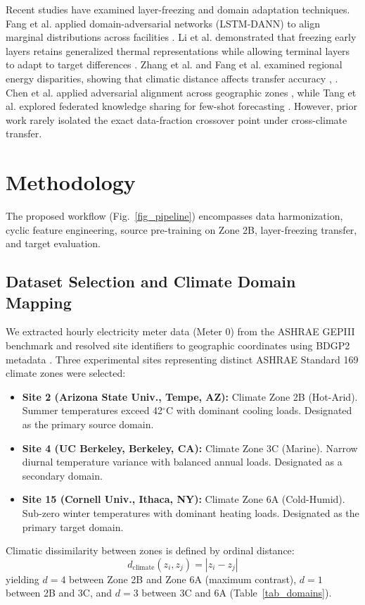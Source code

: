 \documentclass[conference]{IEEEtran}
\begin{document}
Recent studies have examined layer-freezing and domain adaptation techniques. Fang et al. applied domain-adversarial networks (LSTM-DANN) to align marginal distributions across facilities \cite{b12}. Li et al. demonstrated that freezing early layers retains generalized thermal representations while allowing terminal layers to adapt to target differences \cite{b13}. Zhang et al. and Fang et al. examined regional energy disparities, showing that climatic distance affects transfer accuracy \cite{b15}, \cite{b16}. Chen et al. applied adversarial alignment across geographic zones \cite{b17}, while Tang et al. explored federated knowledge sharing for few-shot forecasting \cite{b18}. However, prior work rarely isolated the exact data-fraction crossover point under cross-climate transfer.

\section{Methodology}
The proposed workflow (Fig.~\ref{fig_pipeline}) encompasses data harmonization, cyclic feature engineering, source pre-training on Zone 2B, layer-freezing transfer, and target evaluation.

\subsection{Dataset Selection and Climate Domain Mapping}
We extracted hourly electricity meter data (Meter 0) from the ASHRAE GEPIII benchmark \cite{b1} and resolved site identifiers to geographic coordinates using BDGP2 metadata \cite{b2}. Three experimental sites representing distinct ASHRAE Standard 169 climate zones \cite{b20} were selected:
\begin{itemize}
    \item \textbf{Site 2 (Arizona State Univ., Tempe, AZ):} Climate Zone 2B (Hot-Arid). Summer temperatures exceed 42$^\circ$C with dominant cooling loads. Designated as the primary source domain.
    \item \textbf{Site 4 (UC Berkeley, Berkeley, CA):} Climate Zone 3C (Marine). Narrow diurnal temperature variance with balanced annual loads. Designated as a secondary domain.
    \item \textbf{Site 15 (Cornell Univ., Ithaca, NY):} Climate Zone 6A (Cold-Humid). Sub-zero winter temperatures with dominant heating loads. Designated as the primary target domain.
\end{itemize}

Climatic dissimilarity between zones is defined by ordinal distance:
\begin{equation}
d_{\text{climate}}(z_i, z_j) = |z_i - z_j|
\label{eq_dist}
\end{equation}
yielding $d=4$ between Zone 2B and Zone 6A (maximum contrast), $d=1$ between 2B and 3C, and $d=3$ between 3C and 6A (Table~\ref{tab_domains}).
\end{document}
